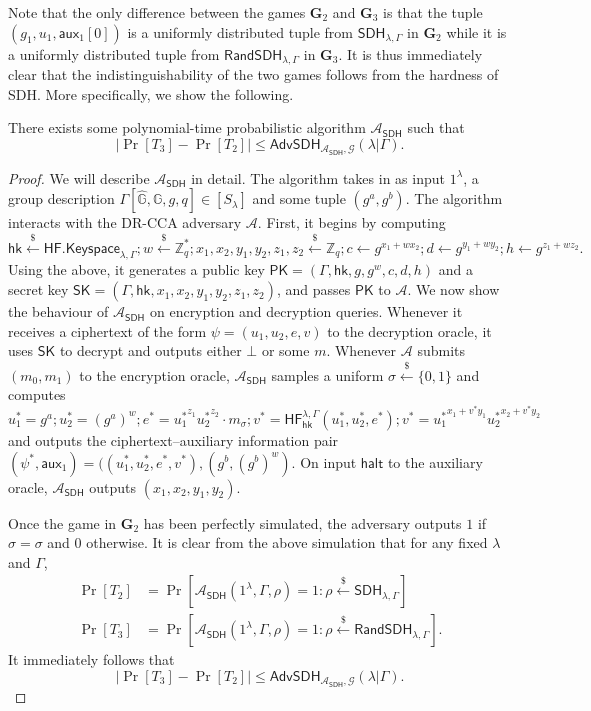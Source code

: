 \documentclass[10pt,a4paper]{article}
\newcommand{\adv}{\mathcal{A}}
\newcommand{\SK}{\mathsf{SK}}
\newcommand{\PK}{\mathsf{PK}}
\newcommand{\rgets}{\xleftarrow{\$}}
\newcommand{\G}{\mathbb{G}}
\newcommand{\aux}{\mathsf{aux}}
\newcommand{\hk}{\mathsf{hk}}
\newcommand{\game}{\mathbf{G}}
\newcommand{\Z}{\mathbb{Z}}
\newcommand{\randsdh}{\mathsf{RandSDH}}
\newcommand{\sdh}{\mathsf{SDH}}
\begin{document}
	Note that the only difference between the games $\game_2$ and $\game_3$ is that the tuple $(g_1, u_1, \aux_1[0])$ is a uniformly distributed tuple from $\sdh_{\lambda,\Gamma}$ in $\game_2$ while it is a uniformly distributed tuple from $\randsdh_{\lambda,\Gamma}$ in $\game_3$. It is thus immediately clear that the indistinguishability of the two games follows from the hardness of SDH. More specifically, we show the following.
	
	\begin{lemma}
		\label{lem:sdh-game}
		There exists some polynomial-time probabilistic algorithm $\adv_\mathsf{SDH}$ such that $$|\Pr[T_3]-\Pr[T_2]|\leq\mathsf{AdvSDH}_{\adv_\mathsf{SDH}, \mathcal{G}}(\lambda|\Gamma).$$
	\end{lemma}
	\begin{proof}
		We will describe $\adv_\mathsf{SDH}$ in detail. The algorithm takes in as input $1^\lambda$, a group description $\Gamma[\hat{\G},\G,g,q]\in[S_\lambda]$ and some tuple $(g^a, g^{b})$. The algorithm interacts with the DR-CCA adversary $\adv$. First, it begins by computing
		$$\hk\rgets\mathsf{HF.Keyspace}_{\lambda, \Gamma}; w\rgets\Z^{*}_q; x_1,x_2,y_1,y_2,z_1,z_2\rgets\Z_q; c\gets g^{x_1+wx_2}; d\gets g^{y_1+wy_2}; h\gets g^{z_1+wz_2}.$$
		Using the above, it generates a public key $\PK = (\Gamma, \hk, g,g^w, c, d, h)$ and a secret key $\SK = (\Gamma,\hk,x_1,x_2,y_1,y_2,z_1,z_2)$, and passes $\PK$ to $\adv$. We now show the behaviour of $\adv_\mathsf{SDH}$ on encryption and decryption queries. Whenever it receives a ciphertext of the form $\psi = (u_1,u_2,e,v)$ to the decryption oracle, it uses $\SK$ to decrypt and outputs either $\bot$ or some $m$. Whenever $\adv$ submits $(m_0,m_1)$ to the encryption oracle, $\adv_\mathsf{SDH}$ samples a uniform $\sigma\rgets\{0,1\}$ and computes
		$$u_1^{*} = g^a; u_2^{*} = (g^a)^w; e^{*} = {u_1^{*}}^{z_1}{u_2^{*}}^{z_2}\cdot m_\sigma; v^{*} =\mathsf{HF}_{\hk}^{\lambda,\Gamma}(u_1^{*},u_2^{*},e^{*}); v^{*} = {u_1^{*}}^{x_1+v^{*}y_1}{u_2^{*}}^{x_2+v^{*}y_2}$$ and outputs the ciphertext--auxiliary information pair $(\psi^{*},\aux_1) = ((u_1^{*},u_2^{*},e^{*},v^{*}), (g^{b}, (g^{b})^w).$ On input $\mathsf{halt}$ to the auxiliary oracle, $\adv_\mathsf{SDH}$ outputs $(x_1,x_2,y_1,y_2)$.
		
		Once the game in $\game_2$ has been perfectly simulated, the adversary outputs $1$ if $\hat{\sigma} = \sigma$ and $0$ otherwise. It is clear from the above simulation that for any fixed $\lambda$ and $\Gamma$, 
		\begin{align*}
			\Pr[T_2] &= \Pr[\adv_\mathsf{SDH}(1^\lambda,\Gamma,\rho) = 1 : \rho\rgets\sdh_{\lambda,\Gamma}]\\
			\Pr[T_3] &= \Pr[\adv_\mathsf{SDH}(1^\lambda,\Gamma,\rho) = 1 : \rho\rgets\randsdh_{\lambda,\Gamma}].
		\end{align*}
		It immediately follows that 
		$$|\Pr[T_3]-\Pr[T_2]|\leq\mathsf{AdvSDH}_{\adv_\mathsf{SDH}, \mathcal{G}}(\lambda|\Gamma).$$
	\end{proof}
	
\end{document}
